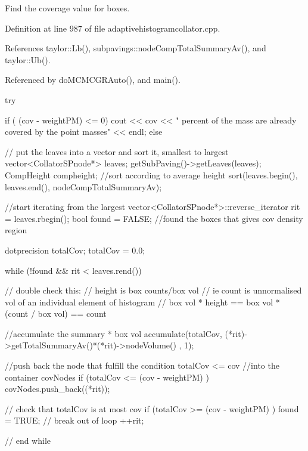 \-Find the coverage value for boxes. 



\-Definition at line 987 of file adaptivehistogramcollator.\-cpp.



\-References taylor\-::\-Lb(), subpavings\-::node\-Comp\-Total\-Summary\-Av(), and taylor\-::\-Ub().



\-Referenced by do\-M\-C\-M\-C\-G\-R\-Auto(), and main().


\begin{DoxyCode}
{
  try {
      
      if ( (cov - weightPM) <= 0) {
        cout << cov << " percent of the mass are already covered by the point
       masses" << endl;
      }
      else {
      
        // put the leaves into a vector and sort it, smallest to largest
        vector<CollatorSPnode*> leaves;
        getSubPaving()->getLeaves(leaves);
        CompHeight compheight;  
        //sort according to average height
        sort(leaves.begin(), leaves.end(), nodeCompTotalSummaryAv);
      
        //start iterating from the largest
        vector<CollatorSPnode*>::reverse_iterator rit = leaves.rbegin();
        bool found = FALSE; //found the boxes that gives cov density region
        
        dotprecision totalCov;
        totalCov = 0.0;
        
        while (!found && rit < leaves.rend()) {
          // double check this:
          // height is box counts/box vol
          // ie count is unnormalised vol of an individual element of histogram
          // box vol * height == box vol * (count / box vol) == count
        
          //accumulate the summary * box vol
          accumulate(totalCov, (*rit)->getTotalSummaryAv()*(*rit)->nodeVolume()
      , 1); 

          //push back the node that fulfill the condition totalCov <= cov 
          //into the container covNodes
          if (totalCov <= (cov - weightPM) ) { 
            covNodes.push_back((*rit)); 
          } 
          
          // check that totalCov is at most cov
          if (totalCov >= (cov - weightPM) ) { found = TRUE; } // break out of
       loop
          ++rit;        
        } // end while 
      
}}}
\end{DoxyCode}
